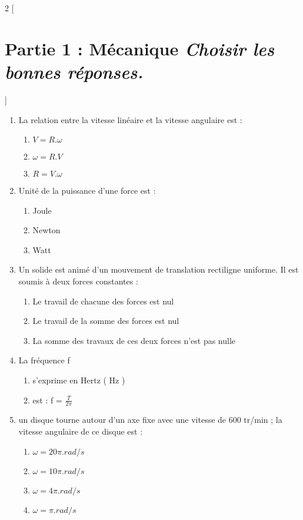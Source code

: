 \documentclass[12pt]{article}
\begin{document}
\vspace{-1cm}
\begin{multicols}{2}
    [
        \section*{Partie 1 : Mécanique \textit{Choisir les bonnes réponses.}}
    ]

\begin{enumerate}
  \item La relation entre la vitesse linéaire et la vitesse angulaire est :
	  \vspace{-0.3cm}
      \begin{enumerate}
          \item $V = R.\omega$\sloppy
          \item $\omega = R.V$\nolinebreak
          \item $R = V.\omega$
      \end{enumerate}

  \item  Unité de la puissance d’une force est :
      \begin{enumerate}
          \item Joule 
		  \item Newton  
		  \item Watt
      \end{enumerate}


 \item  Un solide est animé d’un mouvement de translation rectiligne uniforme. Il est soumis à deux
forces constantes :
      \begin{enumerate}
          \item  Le travail de chacune des forces est nul 
          \item Le travail de la somme des forces est nul
          \item La somme des travaux de ces deux forces n’est pas nulle
      \end{enumerate}
  \item La fréquence f 
	  \begin{enumerate}
		  \item s’exprime en Hertz ( Hz )
		  \item est : f = $\frac{T}{2\pi}$
	  \end{enumerate}

  \item un disque tourne autour d’un axe fixe avec une vitesse de 600 tr/min ; la vitesse angulaire de ce disque est : 
  \begin{enumerate}
	  \item $\omega = 20\pi. rad/s$
	  \item $\omega = 10\pi. rad/s$
	  \item $\omega =4\pi. rad/s$
	  \item $\omega =\pi .rad/s$
  \end{enumerate}


\end{enumerate}
\end{multicols}
\end{document}
